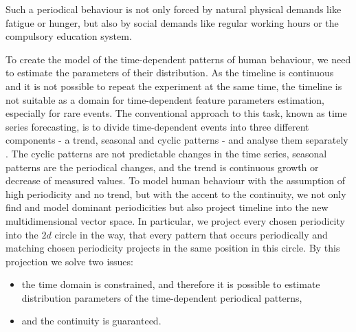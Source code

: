 Such a periodical behaviour is not only forced by natural physical demands like fatigue or hunger, but also by social demands like regular working hours or the compulsory education system. 

To create the model of the time-dependent patterns of human behaviour, we need to estimate the parameters of their distribution.
As the timeline is continuous and it is not possible to repeat the experiment at the same time, the timeline is not suitable as a domain for time-dependent feature parameters estimation, especially for rare events.
The conventional approach to this task, known as time series forecasting, is to divide time-dependent events into three different components - a trend, seasonal and cyclic patterns - and analyse them separately \cite{gould2008forecasting}.
The cyclic patterns are not predictable changes in the time series, seasonal patterns are the periodical changes, and the trend is continuous growth or decrease of measured values.
To model human behaviour with the assumption of high periodicity and no trend, but with the accent to the continuity, we not only find and model dominant periodicities but also project timeline into the new multidimensional vector space.
In particular, we project every chosen periodicity into the $2d$ circle in the way, that every pattern that occurs periodically and matching chosen periodicity projects in the same position in this circle.
By this projection we solve two issues:
\begin{itemize}
    \item the time domain is constrained, and therefore it is possible to estimate distribution parameters of the time-dependent periodical patterns,
    \item and the continuity is guaranteed.
\end{itemize}

